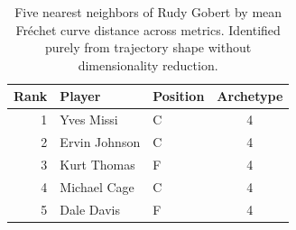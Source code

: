 \begin{table}[htbp]
  \centering\small
  \begin{tabular}{rllc}
    \toprule
    Rank & Player & Position & Archetype \\
    \midrule
    1 & Yves Missi & C & 4 \\
    2 & Ervin Johnson & C & 4 \\
    3 & Kurt Thomas & F & 4 \\
    4 & Michael Cage & C & 4 \\
    5 & Dale Davis & F & 4 \\
    \bottomrule
  \end{tabular}
  \caption{Five nearest neighbors of Rudy Gobert by mean Fr\'{e}chet curve distance across metrics. Identified purely from trajectory shape without dimensionality reduction.}
  \label{tab:Rudy_Gobert_frechet_curve_neighbors}
\end{table}

